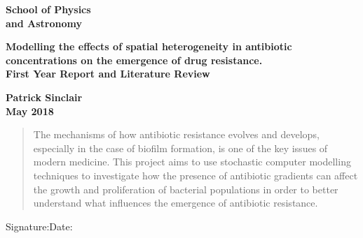 \documentclass[a4paper,12pt]{article}
\begin{document}
\begin{minipage}[b]{110mm}
        {\Huge\bf School of Physics \\and Astronomy
        \vspace*{17mm}}
\end{minipage}
\hfill
\begin{minipage}[t]{40mm}               
\end{minipage}
\par\noindent                                           %
\vspace*{2cm}
\begin{center}
        \Large\bf Modelling the effects of spatial heterogeneity in antibiotic concentrations on the emergence of drug resistance. \\
        \Large\bf First Year Report and Literature Review
\end{center}
\vspace*{1.5cm}
\begin{center}
        \bf Patrick Sinclair\\                 %
        May 2018                          %
\end{center}
\vspace*{5mm}
%
%                       
\begin{abstract}
        The mechanisms of how antibiotic resistance evolves and develops, especially in the case of biofilm formation, is one of the key issues of modern medicine.  
        This project aims to use stochastic computer modelling techniques to investigate how the presence of antibiotic gradients can affect the growth and proliferation 
        of bacterial populations in order to better understand what influences the emergence of antibiotic resistance.
\end{abstract}

\vspace*{1cm}

\vspace*{3cm}
Signature:\hspace*{8cm}Date:
\end{document}
